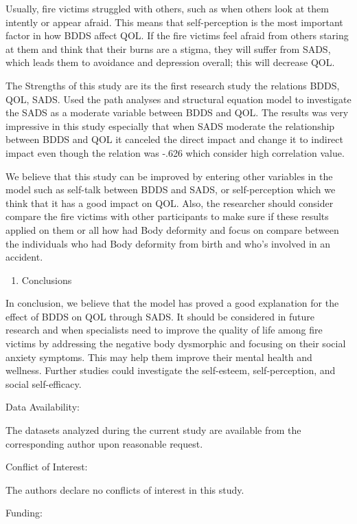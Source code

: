 \documentclass[10pt]{NSP1}
\begin{document}
Usually, fire victims struggled with others, such as when others look at them intently or appear afraid. This means that self-perception is the most important factor in how BDDS affect QOL. If the fire victims feel afraid from others staring at them and think that their burns are a stigma, they will suffer from SADS, which leads them to avoidance and depression overall; this will decrease QOL.

The Strengths of this study are its the first research study the relations BDDS, QOL, SADS. Used the path analyses and structural equation model to investigate the SADS as a moderate variable between BDDS and QOL. The results was very impressive in this study especially that when SADS moderate the relationship between BDDS and QOL it canceled the direct impact and change it to indirect impact even though the relation was -.626 which consider high correlation value.

We believe that this study can be improved by entering other variables in the model such as self-talk between BDDS and SADS, or self-perception which we think that it has a good impact on QOL. Also, the researcher should consider compare the fire victims with other participants to make sure if these results applied on them or all how had Body deformity and focus on compare between the individuals who had Body deformity from birth and who’s involved in an accident.

\begin{enumerate}
  \item Conclusions
\end{enumerate}

In conclusion, we believe that the model has proved a good explanation for the effect of BDDS on QOL through SADS. It should be considered in future research and when specialists need to improve the quality of life among fire victims by addressing the negative body dysmorphic and focusing on their social anxiety symptoms. This may help them improve their mental health and wellness. Further studies could investigate the self-esteem, self-perception, and social self-efficacy.

Data Availability:

The datasets analyzed during the current study are available from the corresponding author upon reasonable request.

Conflict of Interest:

The authors declare no conflicts of interest in this study.

Funding:
\end{document}
